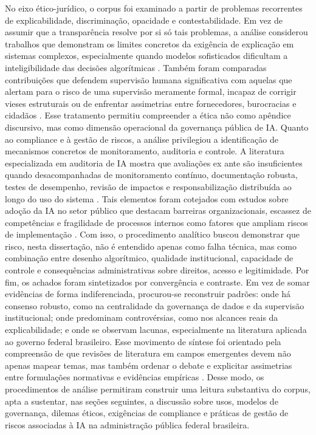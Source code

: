 \documentclass[12pt,a4paper]{article}
\begin{document}
No eixo ético-jurídico, o corpus foi examinado a partir de problemas recorrentes de explicabilidade, discriminação, opacidade e contestabilidade. Em vez de assumir que a transparência resolve por si só tais problemas, a análise considerou trabalhos que demonstram os limites concretos da exigência de explicação em sistemas complexos, especialmente quando modelos sofisticados dificultam a inteligibilidade das decisões algorítmicas \autocite{brkan2020legal}. Também foram comparadas contribuições que defendem supervisão humana significativa com aquelas que alertam para o risco de uma supervisão meramente formal, incapaz de corrigir vieses estruturais ou de enfrentar assimetrias entre fornecedores, burocracias e cidadãos \autocite{parycek2023artificial} \autocite{sigfrids2022how}. Esse tratamento permitiu compreender a ética não como apêndice discursivo, mas como dimensão operacional da governança pública de IA.
Quanto ao compliance e à gestão de riscos, a análise privilegiou a identificação de mecanismos concretos de monitoramento, auditoria e controle. A literatura especializada em auditoria de IA mostra que avaliações ex ante são insuficientes quando desacompanhadas de monitoramento contínuo, documentação robusta, testes de desempenho, revisão de impactos e responsabilização distribuída ao longo do uso do sistema \autocite{mkander2023auditing} \autocite{minkkinen2022continuous}. Tais elementos foram cotejados com estudos sobre adoção da IA no setor público que destacam barreiras organizacionais, escassez de competências e fragilidade de processos internos como fatores que ampliam riscos de implementação \autocite{sharma2021implementing} \autocite{melo2026competencias}. Com isso, o procedimento analítico buscou demonstrar que risco, nesta dissertação, não é entendido apenas como falha técnica, mas como combinação entre desenho algorítmico, qualidade institucional, capacidade de controle e consequências administrativas sobre direitos, acesso e legitimidade.
Por fim, os achados foram sintetizados por convergência e contraste. Em vez de somar evidências de forma indiferenciada, procurou-se reconstruir padrões: onde há consenso robusto, como na centralidade da governança de dados e da supervisão institucional; onde predominam controvérsias, como nos alcances reais da explicabilidade; e onde se observam lacunas, especialmente na literatura aplicada ao governo federal brasileiro. Esse movimento de síntese foi orientado pela compreensão de que revisões de literatura em campos emergentes devem não apenas mapear temas, mas também ordenar o debate e explicitar assimetrias entre formulações normativas e evidências empíricas \autocite{madan2022ai} \autocite{lyrio2025emerging} \autocite{mariano2026inteligencia}. Desse modo, os procedimentos de análise permitiram construir uma leitura substantiva do corpus, apta a sustentar, nas seções seguintes, a discussão sobre usos, modelos de governança, dilemas éticos, exigências de compliance e práticas de gestão de riscos associadas à IA na administração pública federal brasileira.
\end{document}
